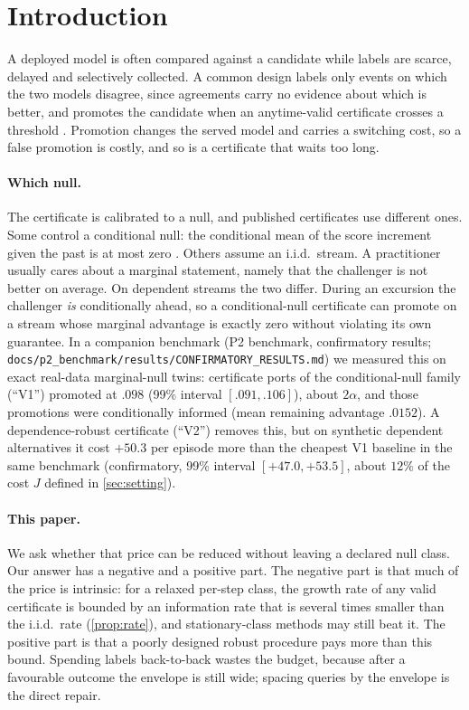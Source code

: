 \section{Introduction}\label{sec:intro}

A deployed model is often compared against a candidate while labels are scarce, delayed and
selectively collected. A common design labels only events on which the two models disagree, since
agreements carry no evidence about which is better, and promotes the candidate when an anytime-valid
certificate crosses a threshold \citep{karampatziakis2021offpolicy,choe2024comparing}. Promotion
changes the served model and carries a switching cost, so a false promotion is costly, and so is a
certificate that waits too long.

\paragraph{Which null.} The certificate is calibrated to a null, and published certificates use
different ones. Some control a conditional null: the conditional mean of the score increment given the
past is at most zero \citep{choe2024comparing}. Others assume an i.i.d.\ stream. A practitioner
usually cares about a marginal statement, namely that the challenger is not better on average. On
dependent streams the two differ. During an excursion the challenger \emph{is} conditionally ahead,
so a conditional-null certificate can promote on a stream whose marginal advantage is exactly zero
without violating its own guarantee. In a companion benchmark (P2 benchmark, confirmatory results;
\texttt{docs/p2\_benchmark/results/CONFIRMATORY\_RESULTS.md}) we measured this on exact real-data
marginal-null twins: certificate ports of the conditional-null family (``V1'') promoted at
$.098$ (99\% interval $[.091,.106]$), about $2\alpha$, and those promotions were conditionally
informed (mean remaining advantage $.0152$). %
A dependence-robust certificate (``V2'') removes this, but on synthetic dependent alternatives it
cost $+50.3$ per episode more than the cheapest V1 baseline in the same benchmark (confirmatory, 99\%
interval $[+47.0,+53.5]$, about $12\%$ of the cost $J$ defined in \cref{sec:setting}).

\paragraph{This paper.} We ask whether that price can be reduced without leaving a declared null
class. Our answer has a negative and a positive part. The negative part is that much of the price is
intrinsic: for a relaxed per-step class, the growth rate of any valid certificate is bounded by an
information rate that is several times smaller than the i.i.d.\ rate (\cref{prop:rate}), and
stationary-class methods may still beat it. The positive part is that a poorly designed robust
procedure pays more than this bound. Spending labels back-to-back wastes the budget, because after a
favourable outcome the envelope is still wide; spacing queries by the envelope is the direct repair.

